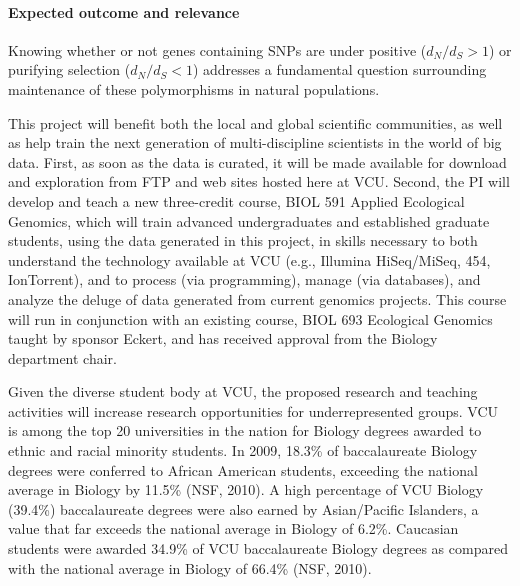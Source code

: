 \paragraph{Expected outcome and relevance}  Knowing whether or not genes containing SNPs are under positive ($d_N/d_S > 1$) or 
purifying selection ($d_N/d_S < 1$) addresses a fundamental question surrounding maintenance of these polymorphisms in 
natural populations.  

This project will benefit both the local and global scientific communities, as well as help train 
the next generation of multi-discipline scientists in the world of big data.  First, as soon as the data is curated, it will be made 
available for download and exploration from FTP and web sites hosted here at VCU.  Second, the PI will develop and teach a new 
three-credit course, BIOL 591 Applied Ecological Genomics, which will train advanced undergraduates and established 
graduate students, using the data generated in this project, in skills necessary to both understand the 
technology available at VCU (e.g., Illumina HiSeq/MiSeq, 454, IonTorrent), and to 
process (via programming), manage (via databases), and analyze the deluge of data generated from current genomics 
projects.  This course will run in conjunction with an existing course, BIOL 693 Ecological Genomics taught by sponsor Eckert, 
and has received approval from the Biology department chair.

Given the diverse student body at VCU, the proposed research and 
teaching activities will increase research opportunities for underrepresented groups. VCU is among the top 20 universities in the 
nation for Biology degrees awarded to ethnic and racial minority students. In 2009, 18.3\% of baccalaureate Biology degrees were 
conferred to African American students, exceeding the national average in Biology by 11.5\% (NSF, 2010). A high percentage of 
VCU Biology (39.4\%) baccalaureate degrees were also earned by Asian/Pacific Islanders, a value that far exceeds the 
national average in Biology of 6.2\%. Caucasian students were awarded 34.9\% of VCU baccalaureate Biology degrees as 
compared with the national average in Biology of 66.4\% (NSF, 2010).

